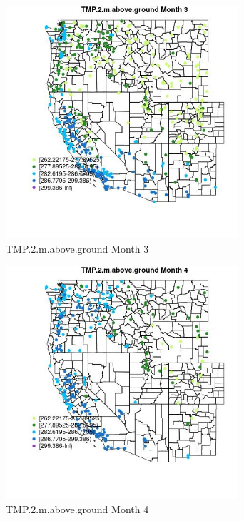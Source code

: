 \begin{figure} 
\centering  
\includegraphics[width=0.77\textwidth]{Code_Outputs/Report_ML_input_PM25_Step4_part_e_de_duplicated_aveswNAs_MapObsMo3TMP2maboveground.jpg} 
\caption{\label{fig:Report_ML_input_PM25_Step4_part_e_de_duplicated_aveswNAsMapObsMo3TMP2maboveground}TMP.2.m.above.ground Month 3} 
\end{figure} 
 

\clearpage 

\begin{figure} 
\centering  
\includegraphics[width=0.77\textwidth]{Code_Outputs/Report_ML_input_PM25_Step4_part_e_de_duplicated_aveswNAs_MapObsMo4TMP2maboveground.jpg} 
\caption{\label{fig:Report_ML_input_PM25_Step4_part_e_de_duplicated_aveswNAsMapObsMo4TMP2maboveground}TMP.2.m.above.ground Month 4} 
\end{figure} 
 

